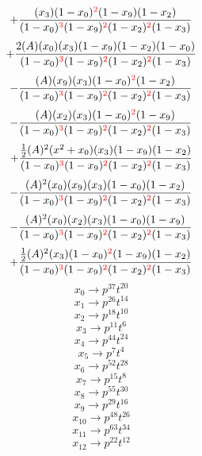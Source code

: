 \documentclass{article}
\begin{document}
\[+\frac{(x_3)(1-x_0)^{\textcolor{red}{2}}(1-x_9)(1-x_2)}{(1-x_0)^{\textcolor{red}{3}}(1-x_9)^{\textcolor{red}{2}}(1-x_2)^{\textcolor{red}{2}}(1-x_3)}\]\[+\frac{2(A)(x_0)(x_3)(1-x_9)(1-x_2)(1-x_0)}{(1-x_0)^{\textcolor{red}{3}}(1-x_9)^{\textcolor{red}{2}}(1-x_2)^{\textcolor{red}{2}}(1-x_3)}\]\[-\frac{(A)(x_9)(x_3)(1-x_0)^{\textcolor{red}{2}}(1-x_2)}{(1-x_0)^{\textcolor{red}{3}}(1-x_9)^{\textcolor{red}{2}}(1-x_2)^{\textcolor{red}{2}}(1-x_3)}\]\[-\frac{(A)(x_2)(x_3)(1-x_0)^{\textcolor{red}{2}}(1-x_9)}{(1-x_0)^{\textcolor{red}{3}}(1-x_9)^{\textcolor{red}{2}}(1-x_2)^{\textcolor{red}{2}}(1-x_3)}\]\[+\frac{\frac{1}{2}(A)^{2}(x^{2}+x_0)(x_3)(1-x_9)(1-x_2)}{(1-x_0)^{\textcolor{red}{3}}(1-x_9)^{\textcolor{red}{2}}(1-x_2)^{\textcolor{red}{2}}(1-x_3)}\]\[-\frac{(A)^{2}(x_0)(x_9)(x_3)(1-x_0)(1-x_2)}{(1-x_0)^{\textcolor{red}{3}}(1-x_9)^{\textcolor{red}{2}}(1-x_2)^{\textcolor{red}{2}}(1-x_3)}\]\[-\frac{(A)^{2}(x_0)(x_2)(x_3)(1-x_0)(1-x_9)}{(1-x_0)^{\textcolor{red}{3}}(1-x_9)^{\textcolor{red}{2}}(1-x_2)^{\textcolor{red}{2}}(1-x_3)}\]\[+\frac{\frac{1}{2}(A)^{2}(x_3)(1-x_0)^{\textcolor{red}{2}}(1-x_9)(1-x_2)}{(1-x_0)^{\textcolor{red}{3}}(1-x_9)^{\textcolor{red}{2}}(1-x_2)^{\textcolor{red}{2}}(1-x_3)}\]\[x_0\rightarrow{p^{37}t^{20}}\]\[x_1\rightarrow{p^{26}t^{14}}\]\[x_2\rightarrow{p^{18}t^{10}}\]\[x_3\rightarrow{p^{11}t^{6}}\]\[x_4\rightarrow{p^{44}t^{24}}\]\[x_5\rightarrow{p^{7}t^{4}}\]\[x_6\rightarrow{p^{52}t^{28}}\]\[x_7\rightarrow{p^{15}t^{8}}\]\[x_8\rightarrow{p^{55}t^{30}}\]\[x_9\rightarrow{p^{29}t^{16}}\]\[x_10\rightarrow{p^{48}t^{26}}\]\[x_11\rightarrow{p^{63}t^{34}}\]\[x_12\rightarrow{p^{22}t^{12}}\]
\end{document}
